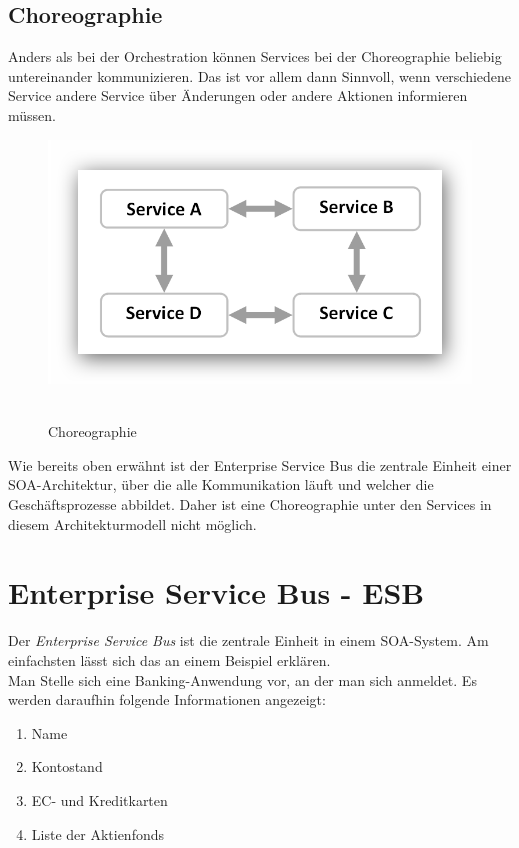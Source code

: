 \subsection{Choreographie}
\label{subsec:choreographie}
Anders als bei der Orchestration können Services bei der Choreographie beliebig untereinander kommunizieren. Das ist vor allem dann Sinnvoll, wenn verschiedene Service andere Service über Änderungen oder andere Aktionen informieren müssen.

\begin{figure}[htb]
    \centering 
    \includegraphics[width=\linewidth]{content/images/ServiceChoreography}\
    \caption[Choreographie]{Choreographie}
    \label{fig:ServiceOrchestration}  
\end{figure}

Wie bereits oben erwähnt ist der Enterprise Service Bus die zentrale Einheit einer SOA-Architektur, über die alle Kommunikation läuft und welcher die Geschäftsprozesse abbildet. Daher ist eine Choreographie unter den Services in diesem Architekturmodell nicht möglich.

\section{Enterprise Service Bus - ESB}
\label{sec:esb}
Der \textit{Enterprise Service Bus} ist die zentrale Einheit in einem SOA-System. Am einfachsten lässt sich das an einem Beispiel erklären.
\\
Man Stelle sich eine Banking-Anwendung vor, an der man sich anmeldet. Es werden daraufhin folgende Informationen angezeigt:

\begin{enumerate}
    \item Name
    \item Kontostand
    \item EC- und Kreditkarten
    \item Liste der Aktienfonds
\end{enumerate}

